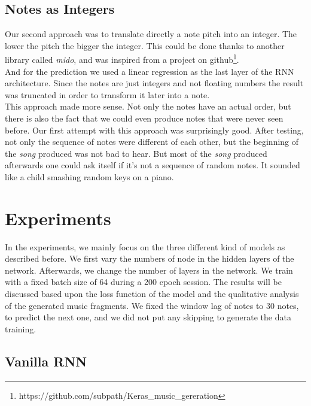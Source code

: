 \documentclass[11pt]
{article}
\begin{document}
\subsection{Notes as Integers}
Our second approach was to translate directly a note pitch into an integer. 
The lower the pitch the bigger the integer.
This could be done thanks to another library called \textit{mido}, and was inspired from a project on github\footnote{https://github.com/subpath/Keras\_music\_gereration}. \\
And for the prediction we used a linear regression as the last layer of the RNN architecture. 
Since the notes are just integers and not floating numbers the result was truncated in order to transform it later into a note.\\
This approach made more sense.
Not only the notes have an actual order, but there is also the fact that we could even produce notes that were never seen before.
Our first attempt with this approach was surprisingly good.
After testing, not only the sequence of notes were different of each other, but the beginning of the \textit{song} produced was not bad to hear.
But most of the \textit{song} produced afterwards one could ask itself if it's not a sequence of random notes.
It sounded like a child smashing random keys on a piano.


\section{Experiments}
In the experiments, we mainly focus on the three different kind of models as described before. We first vary the numbers of node in the hidden layers of the network. Afterwards, we change the number of layers in the network. We train with a fixed batch size of 64 during a 200 epoch session. The results will be discussed based upon the loss function of the model and the qualitative analysis of the generated music fragments. We fixed the window lag of notes to 30 notes, to predict the next one, and we did not put any skipping to generate the data training.


\subsection{Vanilla RNN}
\end{document}
